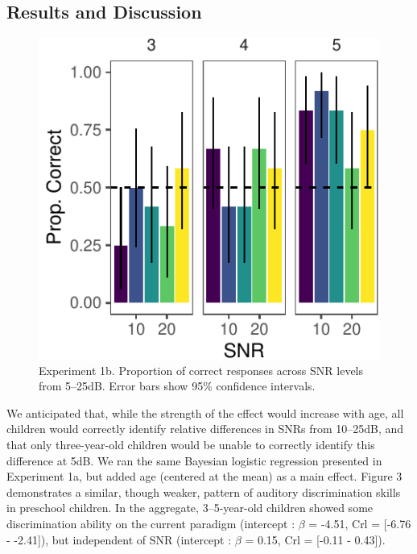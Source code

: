 \documentclass[10pt, letterpaper]{article}
\newenvironment{CodeChunk}{}{}
\begin{document}
\hypertarget{results-and-discussion-1}{%
\subsection{Results and Discussion}\label{results-and-discussion-1}}

\begin{CodeChunk}
\begin{figure}[t]

{\centering \includegraphics{figs/e1b-bar-1} 

}

\caption[Experiment 1b]{Experiment 1b. Proportion of correct responses across SNR levels from 5--25dB. Error bars show 95\% confidence intervals.}\label{fig:e1b-bar}
\end{figure}
\end{CodeChunk}

We anticipated that, while the strength of the effect would increase
with age, all children would correctly identify relative differences in
SNRs from 10--25dB, and that only three-year-old children would be
unable to correctly identify this difference at 5dB. We ran the same
Bayesian logistic regression presented in Experiment 1a, but added age
(centered at the mean) as a main effect. Figure 3 demonstrates a
similar, though weaker, pattern of auditory discrimination skills in
preschool children. In the aggregate, 3--5-year-old children showed some
discrimination ability on the current paradigm (intercept : \(\beta\) =
-4.51, Crl = {[}-6.76 - -2.41{]}), but independent of SNR (intercept :
\(\beta\) = 0.15, Crl = {[}-0.11 - 0.43{]}).
\end{document}
